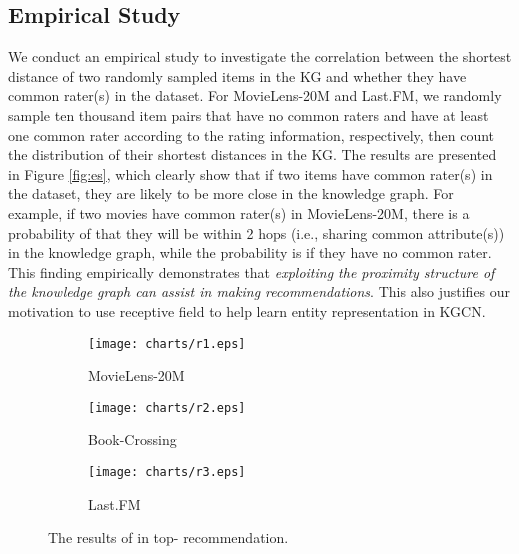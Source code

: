 \documentclass[sigconf]{acmart}
\begin{document}
	\subsection{Empirical Study}        
		We conduct an empirical study to investigate the correlation between the shortest distance of two randomly sampled items in the KG and whether they have common rater(s) in the dataset.
		For MovieLens-20M and Last.FM, we randomly sample ten thousand item pairs that have no common raters and have at least one common rater according to the rating information, respectively, then count the distribution of their shortest distances in the KG.
		The results are presented in Figure \ref{fig:es}, which clearly show that if two items have common rater(s) in the dataset, they are likely to be more close in the knowledge graph.
		For example, if two movies have common rater(s) in MovieLens-20M, there is a probability of  that they will be within 2 hops (i.e., sharing common attribute(s)) in the knowledge graph, while the probability is  if they have no common rater.
		This finding empirically demonstrates that \textit{exploiting the proximity structure of the knowledge graph can assist in making recommendations}.
		This also justifies our motivation to use receptive field to help learn entity representation in KGCN.
	\fi
		
		
	\begin{figure*}[t]
		\centering
        \begin{subfigure}[b]{0.32\textwidth}
            \texttt{[image: charts/r1.eps]}
            \caption{MovieLens-20M}
            \label{fig:res_1}
        \end{subfigure}
        \hfill
        \begin{subfigure}[b]{0.32\textwidth}
            \texttt{[image: charts/r2.eps]}
            \caption{Book-Crossing}
            \label{fig:res_2}
        \end{subfigure}
        \hfill
        \begin{subfigure}[b]{0.32\textwidth}
            \texttt{[image: charts/r3.eps]}
            \caption{Last.FM}
            \label{fig:res_3}
        \end{subfigure}
        \vspace{-0.1in}
        \caption{The results of  in top- recommendation.}
        \label{fig:topk}
    \end{figure*}
        
		
\end{document}

